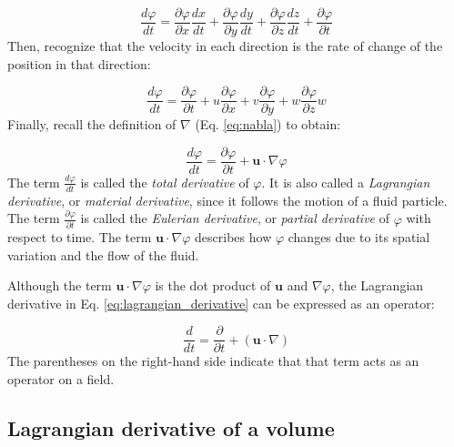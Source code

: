 \documentclass[12pt]{article}
\numberwithin{equation}{section}
\numberwithin{figure}{section}
\numberwithin{table}{section}
\begin{document}
\begin{equation}
  \frac{d\varphi}{dt} = \frac{\partial \varphi}{\partial x} \frac{dx}{dt} +
    \frac{\partial \varphi}{\partial y} \frac{dy}{dt} +
    \frac{\partial \varphi}{\partial z} \frac{dz}{dt} +
    \frac{\partial \varphi}{\partial t}
\end{equation}
Then, recognize that the velocity in each direction is the rate of change of
the position in that direction:

\begin{equation}
  \frac{d\varphi}{dt} =
    \frac{\partial \varphi}{\partial t} +
    u \frac{\partial \varphi}{\partial x} +
    v \frac{\partial \varphi}{\partial y} +
    w \frac{\partial \varphi}{\partial z} w
\end{equation}
Finally, recall the definition of $\nabla$ (Eq. \ref{eq:nabla}) to obtain:

\begin{equation}
  \label{eq:lagrangian_derivative}
  \frac{d\varphi}{dt} = \frac{\partial \varphi}{\partial t} + \mathbf{u} \cdot \nabla \varphi
\end{equation}
The term $\frac{d\varphi}{dt}$ is called the \textit{total derivative}
of $\varphi$. It is also called a \textit{Lagrangian derivative},
or \textit{material derivative}, since it follows
the motion of a fluid particle.
The term $\frac{\partial \varphi}{\partial t}$ is called the
\textit{Eulerian derivative},
or \textit{partial derivative}
of $\varphi$ with respect to time.
The term $\mathbf{u} \cdot \nabla \varphi$ describes how $\varphi$ changes due
to its spatial variation and the flow of the fluid.

Although the term $\mathbf{u} \cdot \nabla \varphi$ is the dot product of
$\mathbf{u}$ and $\nabla \varphi$, the Lagrangian derivative in Eq.
\ref{eq:lagrangian_derivative} can be expressed as an operator:

\begin{equation}
  \frac{d}{dt} = \frac{\partial}{\partial t} + (\mathbf{u} \cdot \nabla)
\end{equation}
The parentheses on the right-hand side indicate that that term acts as an
operator on a field.

\subsection{Lagrangian derivative of a volume}
\end{document}

